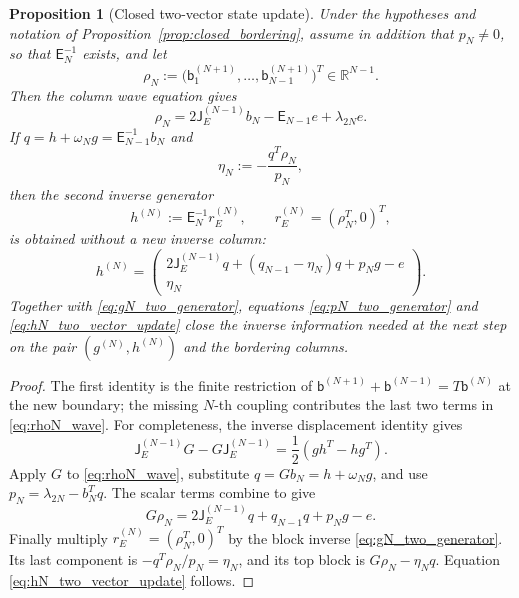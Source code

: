 \documentclass[11pt]{amsart}
\numberwithin{equation}{section}
\theoremstyle{plain}
\newtheorem{proposition}[theorem]{Proposition}
\theoremstyle{definition}
\theoremstyle{remark}
\newcommand{\E}{\mathsf E}
\newcommand{\J}{\mathsf J}
\begin{document}
\begin{proposition}[Closed two-vector state update]
\label{prop:two_vector_state_update}
Under the hypotheses and notation of Proposition~\ref{prop:closed_bordering}, assume in addition
that \(p_N\ne0\), so that \(\E_N^{-1}\) exists, and let
\begin{equation}
 \rho_N:=\bigl(\mathsf b^{(N+1)}_1,\dots,\mathsf b^{(N+1)}_{N-1}\bigr)^T\in\mathbb R^{N-1}.
 \label{eq:rhoN_two_vector}
\end{equation}
Then the column wave equation gives
\begin{equation}
 \boxed{\;
 \rho_N=2\J_E^{(N-1)}b_N-\E_{N-1}e+\lambda_{2N}e .\;}
 \label{eq:rhoN_wave}
\end{equation}
If $q=h+\omega_Ng=\E_{N-1}^{-1}b_N$ and
\begin{equation}
 \eta_N:=-\frac{q^T\rho_N}{p_N},
 \label{eq:etaN_two_vector}
\end{equation}
then the second inverse generator
\begin{equation}
 h^{(N)}:=\E_N^{-1}r_E^{(N)},
 \qquad
 r_E^{(N)}=(\rho_N^T,0)^T,
\end{equation}
is obtained without a new inverse column:
\begin{equation}
 \boxed{
 h^{(N)}=
 \begin{pmatrix}
 2\J_E^{(N-1)}q+(q_{N-1}-\eta_N)q+p_Ng-e\\[2pt]
 \eta_N
 \end{pmatrix}.}
 \label{eq:hN_two_vector_update}
\end{equation}
Together with \eqref{eq:gN_two_generator}, equations
\eqref{eq:pN_two_generator} and \eqref{eq:hN_two_vector_update} close the inverse information
needed at the next step on the pair $(g^{(N)},h^{(N)})$ and the bordering columns.
\end{proposition}

\begin{proof}
The first identity is the finite restriction of
$\mathsf b^{(N+1)}+\mathsf b^{(N-1)}=T\mathsf b^{(N)}$ at the new boundary; the missing
$N$-th coupling contributes the last two terms in \eqref{eq:rhoN_wave}.  For completeness,
the inverse displacement identity gives
\begin{equation}
 \J_E^{(N-1)}G-G\J_E^{(N-1)}
 =\frac12(gh^T-hg^T).
 \label{eq:inverse_displacement_gh_local}
\end{equation}
Apply $G$ to \eqref{eq:rhoN_wave}, substitute $q=Gb_N=h+\omega_Ng$, and use
$p_N=\lambda_{2N}-b_N^Tq$.  The scalar terms combine to give
\begin{equation}
 G\rho_N=2\J_E^{(N-1)}q+q_{N-1}q+p_Ng-e.
 \label{eq:Grho_two_vector}
\end{equation}
Finally multiply $r_E^{(N)}=(\rho_N^T,0)^T$ by the block inverse
\eqref{eq:gN_two_generator}.  Its last component is $-q^T\rho_N/p_N=\eta_N$, and its top
block is $G\rho_N-\eta_Nq$.  Equation \eqref{eq:hN_two_vector_update} follows.
\end{proof}
\end{document}
